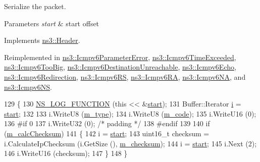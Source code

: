 Serialize the packet. 


\begin{DoxyParams}{Parameters}
{\em start} & start offset \\
\hline
\end{DoxyParams}


Implements \hyperlink{classns3_1_1Header_afb61f1aac69ff8349a6bfe521fab5404}{ns3\+::\+Header}.



Reimplemented in \hyperlink{classns3_1_1Icmpv6ParameterError_a72ba841a8b45117a67cfb9a89ffd677b}{ns3\+::\+Icmpv6\+Parameter\+Error}, \hyperlink{classns3_1_1Icmpv6TimeExceeded_a8cc2085dcd82138138cdc2029280a60f}{ns3\+::\+Icmpv6\+Time\+Exceeded}, \hyperlink{classns3_1_1Icmpv6TooBig_ae8042b6593cfb81dad23e60c588e7b21}{ns3\+::\+Icmpv6\+Too\+Big}, \hyperlink{classns3_1_1Icmpv6DestinationUnreachable_a97ea83de54f105a43a8386e2934fe732}{ns3\+::\+Icmpv6\+Destination\+Unreachable}, \hyperlink{classns3_1_1Icmpv6Echo_ae00908cfd1912f20da4ad804ce73ba1d}{ns3\+::\+Icmpv6\+Echo}, \hyperlink{classns3_1_1Icmpv6Redirection_a3d278de1bcf39046510795bd78a4acfa}{ns3\+::\+Icmpv6\+Redirection}, \hyperlink{classns3_1_1Icmpv6RS_aa2e8d1a63701015e774a9a5d660dfde4}{ns3\+::\+Icmpv6\+RS}, \hyperlink{classns3_1_1Icmpv6RA_afc9c2386a4c11b13c41d79f0dbc970cd}{ns3\+::\+Icmpv6\+RA}, \hyperlink{classns3_1_1Icmpv6NA_a0fa9ef58e0cb6c9a5ed1d4c82745a02f}{ns3\+::\+Icmpv6\+NA}, and \hyperlink{classns3_1_1Icmpv6NS_ad32a9d574a29228cddfc6e70aea129b7}{ns3\+::\+Icmpv6\+NS}.


\begin{DoxyCode}
129 \{
130   \hyperlink{log-macros-disabled_8h_a90b90d5bad1f39cb1b64923ea94c0761}{NS\_LOG\_FUNCTION} (\textcolor{keyword}{this} << &\hyperlink{namespacevisualizer_1_1core_a2a35e5d8a34af358b508dac8635754e0}{start});
131   Buffer::Iterator \hyperlink{bernuolliDistribution_8m_a6f6ccfcf58b31cb6412107d9d5281426}{i} = \hyperlink{namespacevisualizer_1_1core_a2a35e5d8a34af358b508dac8635754e0}{start};
132 
133   i.WriteU8 (\hyperlink{classns3_1_1Icmpv6Header_ab8ff041725f233554ea52c49a29ee1a9}{m\_type});
134   i.WriteU8 (\hyperlink{classns3_1_1Icmpv6Header_a4f0268e1df07589e9fb7da198592fdf9}{m\_code});
135   i.WriteU16 (0);
136 \textcolor{preprocessor}{#if 0}
137   i.WriteU32 (0); \textcolor{comment}{/* padding */}
138 \textcolor{preprocessor}{#endif}
139 
140   \textcolor{keywordflow}{if} (\hyperlink{classns3_1_1Icmpv6Header_afdfd2dc6e28e0504e02c741d9585ccf9}{m\_calcChecksum})
141     \{
142       i = \hyperlink{namespacevisualizer_1_1core_a2a35e5d8a34af358b508dac8635754e0}{start};
143       uint16\_t checksum = i.CalculateIpChecksum (i.GetSize (), \hyperlink{classns3_1_1Icmpv6Header_a6fe65b5998d91492bf6c1e13c8a0f29c}{m\_checksum});
144       i = \hyperlink{namespacevisualizer_1_1core_a2a35e5d8a34af358b508dac8635754e0}{start};
145       i.Next (2);
146       i.WriteU16 (checksum);
147     \}
148 \}
\end{DoxyCode}


